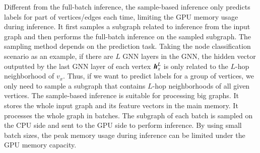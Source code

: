 Different from the full-batch inference, the sample-based inference only predicts labels for part of vertices/edges each time, limiting the GPU memory usage during inference.
%
It first samples a subgraph related to inference from the input graph and then performs the full-batch inference on the sampled subgraph.
%
The sampling method depends on the prediction task.
%
Taking the node classification scenario as an example, if there are $L$ GNN layers in the GNN, the hidden vector outputted by the last GNN layer of each vertex $\boldsymbol{h}^L_x$ is only related to the $L$-hop neighborhood of $v_x$.
%
Thus, if we want to predict labels for a group of vertices, we only need to sample a subgraph that contains $L$-hop neighborhoods of all given vertices.
%
The sample-based inference is suitable for processing big graphs.
%
It stores the whole input graph and its feature vectors in the main memory.
%
It processes the whole graph in batches.
%
The subgraph of each batch is sampled on the CPU side and sent to the GPU side to perform inference.
%
By using small batch sizes, the peak memory usage during inference can be limited under the GPU memory capacity.

